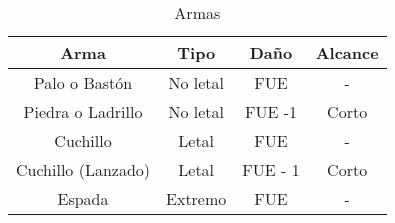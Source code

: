 

\begin{table}[ht]
\begin{tabular}{cccc}
\toprule
Arma&Tipo&Daño&Alcance\\\midrule\midrule
Palo o Bastón&No letal&FUE&-\\\midrule
Piedra o Ladrillo&No letal&FUE -1&Corto\\\midrule
Cuchillo&Letal&FUE&-\\\midrule
Cuchillo (Lanzado)&Letal&FUE - 1&Corto\\\midrule
Espada&Extremo&FUE&-\\\midrule
\bottomrule
\end{tabular}
\caption{Armas}
\end{table}

